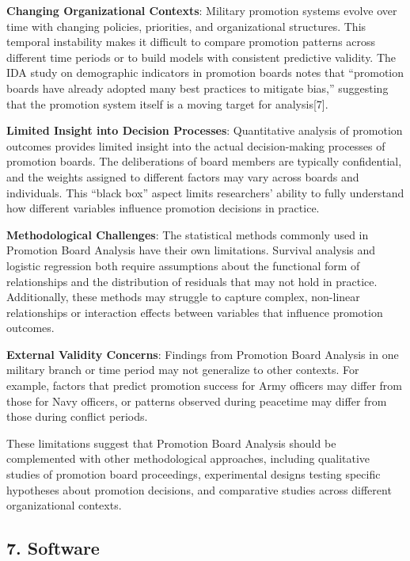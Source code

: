 \documentclass[
  letterpaper,
  DIV=11,
  numbers=noendperiod]{scrartcl}
\begin{document}
\textbf{Changing Organizational Contexts}: Military promotion systems
evolve over time with changing policies, priorities, and organizational
structures. This temporal instability makes it difficult to compare
promotion patterns across different time periods or to build models with
consistent predictive validity. The IDA study on demographic indicators
in promotion boards notes that ``promotion boards have already adopted
many best practices to mitigate bias,'' suggesting that the promotion
system itself is a moving target for analysis{[}7{]}.

\textbf{Limited Insight into Decision Processes}: Quantitative analysis
of promotion outcomes provides limited insight into the actual
decision-making processes of promotion boards. The deliberations of
board members are typically confidential, and the weights assigned to
different factors may vary across boards and individuals. This ``black
box'' aspect limits researchers' ability to fully understand how
different variables influence promotion decisions in practice.

\textbf{Methodological Challenges}: The statistical methods commonly
used in Promotion Board Analysis have their own limitations. Survival
analysis and logistic regression both require assumptions about the
functional form of relationships and the distribution of residuals that
may not hold in practice. Additionally, these methods may struggle to
capture complex, non-linear relationships or interaction effects between
variables that influence promotion outcomes.

\textbf{External Validity Concerns}: Findings from Promotion Board
Analysis in one military branch or time period may not generalize to
other contexts. For example, factors that predict promotion success for
Army officers may differ from those for Navy officers, or patterns
observed during peacetime may differ from those during conflict periods.

These limitations suggest that Promotion Board Analysis should be
complemented with other methodological approaches, including qualitative
studies of promotion board proceedings, experimental designs testing
specific hypotheses about promotion decisions, and comparative studies
across different organizational contexts.

\subsection{7. Software}\label{software}
\end{document}

